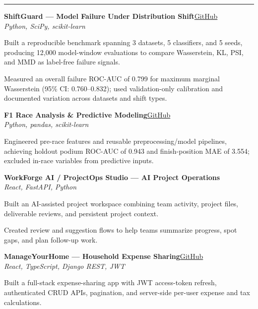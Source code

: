 \documentclass[10pt,letterpaper]{article}
\newcommand{\ressection}[1]{\par\vspace{8pt}{\large\scshape #1}\par\vspace{2pt}\hrule\vspace{5pt}}
\newenvironment{bullets}{\begin{list}{\textendash}{\setlength{\leftmargin}{1.3em}\setlength{\labelsep}{0.4em}\setlength{\topsep}{3pt}\setlength{\itemsep}{2pt}\setlength{\parsep}{0pt}\setlength{\partopsep}{0pt}}}{\end{list}}
\begin{document}
\ressection{Selected Projects}
\textbf{ShiftGuard --- Model Failure Under Distribution Shift}\hfill\href{https://github.com/kshitiz-tech/ShiftGuard}{GitHub}\\
{\small\textit{Python, SciPy, scikit-learn}}
\begin{bullets}
\item Built a reproducible benchmark spanning 3 datasets, 5 classifiers, and 5 seeds, producing 12,000 model-window evaluations to compare Wasserstein, KL, PSI, and MMD as label-free failure signals.
\item Measured an overall failure ROC-AUC of 0.799 for maximum marginal Wasserstein (95\% CI: 0.760--0.832); used validation-only calibration and documented variation across datasets and shift types.
\end{bullets}

\vspace{3pt}
\textbf{F1 Race Analysis \& Predictive Modeling}\hfill\href{https://github.com/kshitiz-tech/F1\_data\_analysis}{GitHub}\\
{\small\textit{Python, pandas, scikit-learn}}
\begin{bullets}
\item Engineered pre-race features and reusable preprocessing/model pipelines, achieving holdout podium ROC-AUC of 0.943 and finish-position MAE of 3.554; excluded in-race variables from predictive inputs.
\end{bullets}

\vspace{3pt}
\textbf{WorkForge AI / ProjectOps Studio --- AI Project Operations}\\
{\small\textit{React, FastAPI, Python}}
\begin{bullets}
\item Built an AI-assisted project workspace combining team activity, project files, deliverable reviews, and persistent project context.
\item Created review and suggestion flows to help teams summarize progress, spot gaps, and plan follow-up work.
\end{bullets}

\vspace{3pt}
\textbf{ManageYourHome --- Household Expense Sharing}\hfill\href{https://github.com/kshitiz-tech/ManageYourHome}{GitHub}\\
{\small\textit{React, TypeScript, Django REST, JWT}}
\begin{bullets}
\item Built a full-stack expense-sharing app with JWT access-token refresh, authenticated CRUD APIs, pagination, and server-side per-user expense and tax calculations.
\end{bullets}
\end{document}
